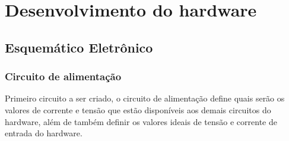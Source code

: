 
















\section{Desenvolvimento do hardware}

\subsection{Esquemático Eletrônico}

\subsubsection{Circuito de alimentação}

Primeiro circuito a ser criado, o circuito de alimentação define quais serão os valores de corrente e tensão que estão disponíveis aos demais circuitos do hardware, além de também definir os valores ideais de tensão e corrente de entrada do hardware. 


